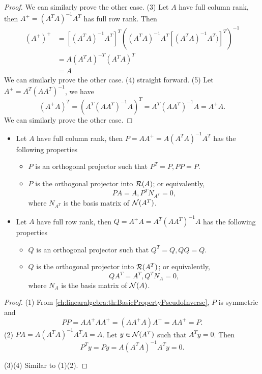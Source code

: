 \begin{refsection}
\begin{proof}
We can similarly prove the other case.
(3)
Let $A$ have full column rank, then $A^+ = (A^TA)^{-1}A^T$ has full row rank. Then
\begin{align*}
(A^+)^+ &= [(A^TA)^{-1}A^T]^T((A^TA)^{-1}A^T [(A^TA)^{-1}A^T)]^T)^{-1}\\
&=A(A^TA)^{-T} (A^TA)^T \\
&=A
\end{align*}
We can similarly prove the other case.
(4) straight forward.
(5) Let $A^+ =  A^T(AA^T)^{-1}$, we have
$$(A^+A)^T =  (A^T(AA^T)^{-1} A)^T = A^T(AA^T)^{-1} A = A^+A.$$
We can similarly prove the other case.
\end{proof}


\begin{lemma}\label{ch:linearalgebra:th:ProjectorPropertyFromPseudoInverse}\hfill
\begin{itemize}
	\item Let $A$ have full column rank, then $P = AA^+ = A(A^TA)^{-1}A^T$ has the following properties
	\begin{itemize}
		\item $P$ is an orthogonal projector such that $P^T = P, PP = P.$
		\item $P$ is the orthogonal projector into $\mathcal{R}(A)$; or equivalently, $$PA = A, P^TN_{A^T} = 0,$$
		where $N_{A^T}$ is the basis matrix of $\mathcal{N}(A^T)$.
	\end{itemize}
	\item Let $A$ have full row rank, then $Q = A^+A = A^T(AA^T)^{-1}A$ has the following properties
\begin{itemize}
	\item $Q$ is an orthogonal projector such that $Q^T = Q, QQ = Q.$
	\item $Q$ is the orthogonal projector into $\mathcal{R}(A^T)$; or equivalently, $$QA^T = A^T, Q^TN_{A} = 0,$$
	where $N_{A}$ is the basis matrix of $\mathcal{N}(A)$.
\end{itemize}
\end{itemize}	
\end{lemma}
\begin{proof}
(1) From \autoref{ch:linearalgebra:th:BasicPropertyPseudoInverse}, $P$ is symmetric and 
$$PP = AA^+AA^+ =(AA^+A)A^+= AA^+ = P.$$
(2) $PA = A(A^TA)^{-1}A^TA = A$. Let $y \in \mathcal{N}(A^T)$ such that $A^Ty = 0$. Then
$$P^Ty = Py = A(A^TA)^{-1}A^Ty = 0.$$

(3)(4) Similar to (1)(2).
\end{proof}


\end{refsection}
